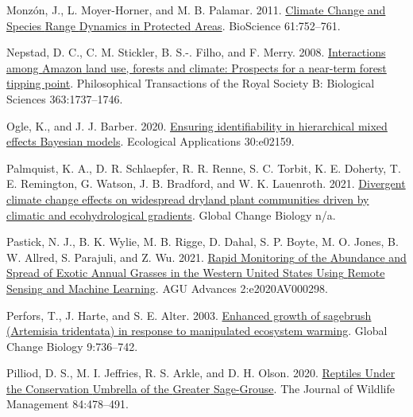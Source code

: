 \documentclass[
  12pt,
]{article}
\newlength{\cslhangindent}
\newlength{\cslentryspacingunit} %
\newenvironment{CSLReferences}[2] %
 {%
  \setlength{\parindent}{0pt}
  \ifodd #1
  \let\oldpar\par
  \def\par{\hangindent=\cslhangindent\oldpar}
  \fi
  \setlength{\parskip}{#2\cslentryspacingunit}
 }%
 {}
\begin{document}
\begin{CSLReferences}{1}{0}
\leavevmode{}%
Monzón, J., L. Moyer-Horner, and M. B. Palamar. 2011. \href{https://doi.org/10.1525/bio.2011.61.10.5}{Climate {Change} and {Species} {Range} {Dynamics} in {Protected} {Areas}}. BioScience 61:752--761.

\leavevmode{}%
Nepstad, D. C., C. M. Stickler, B. S.-. Filho, and F. Merry. 2008. \href{https://doi.org/10.1098/rstb.2007.0036}{Interactions among {Amazon} land use, forests and climate: Prospects for a near-term forest tipping point}. Philosophical Transactions of the Royal Society B: Biological Sciences 363:1737--1746.

\leavevmode{}%
Ogle, K., and J. J. Barber. 2020. \href{https://doi.org/10.1002/eap.2159}{Ensuring identifiability in hierarchical mixed effects {Bayesian} models}. Ecological Applications 30:e02159.

\leavevmode{}%
Palmquist, K. A., D. R. Schlaepfer, R. R. Renne, S. C. Torbit, K. E. Doherty, T. E. Remington, G. Watson, J. B. Bradford, and W. K. Lauenroth. 2021. \href{https://doi.org/10.1111/gcb.15776}{Divergent climate change effects on widespread dryland plant communities driven by climatic and ecohydrological gradients}. Global Change Biology n/a.

\leavevmode{}%
Pastick, N. J., B. K. Wylie, M. B. Rigge, D. Dahal, S. P. Boyte, M. O. Jones, B. W. Allred, S. Parajuli, and Z. Wu. 2021. \href{https://doi.org/10.1029/2020AV000298}{Rapid {Monitoring} of the {Abundance} and {Spread} of {Exotic} {Annual} {Grasses} in the {Western} {United} {States} {Using} {Remote} {Sensing} and {Machine} {Learning}}. AGU Advances 2:e2020AV000298.

\leavevmode{}%
Perfors, T., J. Harte, and S. E. Alter. 2003. \href{https://doi.org/10.1046/j.1365-2486.2003.00559.x}{Enhanced growth of sagebrush ({Artemisia} tridentata) in response to manipulated ecosystem warming}. Global Change Biology 9:736--742.

\leavevmode{}%
Pilliod, D. S., M. I. Jeffries, R. S. Arkle, and D. H. Olson. 2020. \href{https://doi.org/10.1002/jwmg.21821}{Reptiles {Under} the {Conservation} {Umbrella} of the {Greater} {Sage}-{Grouse}}. The Journal of Wildlife Management 84:478--491.


\end{CSLReferences}
\end{document}
